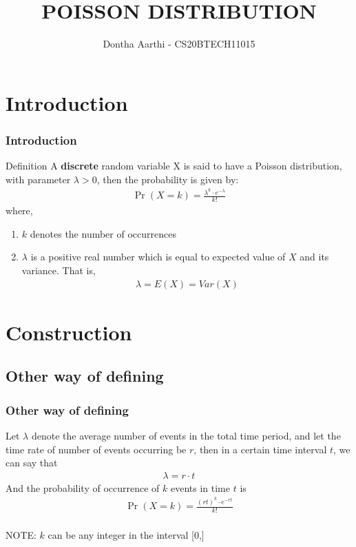 \documentclass{beamer}
\title{POISSON DISTRIBUTION}
\author{Dontha Aarthi - CS20BTECH11015}
\providecommand{\pr}[1]{\ensuremath{\Pr\left(#1\right)}}
\begin{document}
\begin{frame}
\titlepage
\end{frame}
\section{Introduction}
\begin{frame}
\frametitle{Introduction}
\begin{block}{Definition}
A \textbf{discrete} random variable X is said to have a Poisson distribution, with parameter $\lambda >0$, then the probability is given by:
\begin{align}
    \pr{X=k}=\frac{\lambda^k\cdot e^{-\lambda}}{k!} \label{formula}
\end{align}
where,\\
\begin{enumerate}
\item $k$ denotes the number of occurrences\\
    \item $\lambda$ is a positive real number which is equal to expected value of $X$ and its variance.
    That is,
    \begin{align}
        \lambda=E(X)=Var(X)
    \end{align}
\end{enumerate}

\end{block}
\end{frame}

\section{\textbf{Construction}}
\subsection*{Other way of defining}
\begin{frame}[fragile]
\frametitle{Other way of defining}
Let $\lambda$ denote the average number of events in the total time period, and let the time rate of number of events occurring be $r$, then in a certain time interval $t$, we can say that
\begin{align}
    \lambda=r\cdot t
\end{align}
And the probability of occurrence of $k$ events in time $t$ is
\begin{align}
    \pr{X=k}=\frac{(rt)^k\cdot e^{-rt}}{k!}
\end{align}\\

NOTE: $k$ can be any integer in the interval [0,\infty]
\end{frame}
\end{document}
